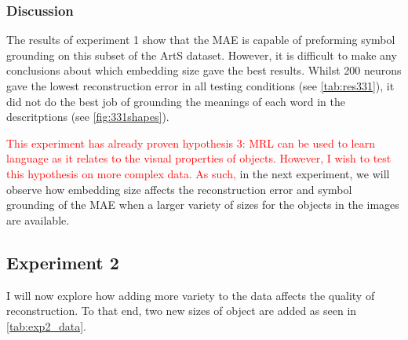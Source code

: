 \subsubsection{Discussion}
The results of experiment 1 show that the \ac{MAE} is capable of preforming symbol grounding on this subset of the ArtS dataset. However, it is difficult to make any conclusions about which embedding size gave the best results. Whilst 200 neurons gave the lowest reconstruction error in all testing conditions (see \autoref{tab:res331}), it did not do the best job of grounding the meanings of each word in the descritptions (see \autoref{fig:331shapes}). 

\textcolor{red}{This experiment has already proven hypothesis 3: \ac{MRL} can be used to learn language as it relates to the visual properties of objects. However, I wish to test this hypothesis on more complex data. As such,} in the next experiment, we will observe how embedding size affects the reconstruction error and symbol grounding of the \ac{MAE} when a larger variety of sizes for the objects in the images are available.


\newpage
\subsection{Experiment 2}
I will now explore how adding more variety to the data affects the quality of reconstruction. To that end, two new sizes of object are added as seen in \autoref{tab:exp2_data}. 

